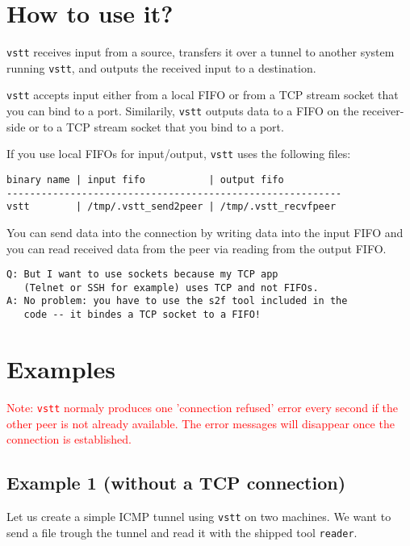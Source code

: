 \documentclass[10pt,a4paper]{article}
\begin{document}
\section{How to use it?}

\texttt{vstt} receives input from a source, transfers it over a tunnel to another system
running \texttt{vstt}, and outputs the received input to a destination.

\texttt{vstt} accepts input either from a local FIFO or from a TCP stream socket that
you can bind to a port. Similarily, \texttt{vstt} outputs data to a FIFO on the receiver-side or to a TCP
stream socket that you bind to a port.

If you use local FIFOs for input/output, \texttt{vstt} uses the following files:

\begin{verbatim}
binary name | input fifo           | output fifo
----------------------------------------------------------
vstt        | /tmp/.vstt_send2peer | /tmp/.vstt_recvfpeer
\end{verbatim}

You can send data into the connection by writing data into
the input FIFO and you can read received data from the peer
via reading from the output FIFO.

\begin{verbatim}
Q: But I want to use sockets because my TCP app
   (Telnet or SSH for example) uses TCP and not FIFOs.
A: No problem: you have to use the s2f tool included in the
   code -- it bindes a TCP socket to a FIFO!
\end{verbatim}

\section{Examples}

\textcolor{red}{Note: \texttt{vstt} normaly produces one 'connection refused' error every
second if the other peer is not already available. The error messages will
disappear once the connection is established.}

\subsection{Example 1 (without a TCP connection)}

Let us create a simple ICMP tunnel using \texttt{vstt} on two machines.
We want to send a file trough the tunnel and read it with the
shipped tool \texttt{reader}.
\end{document}
